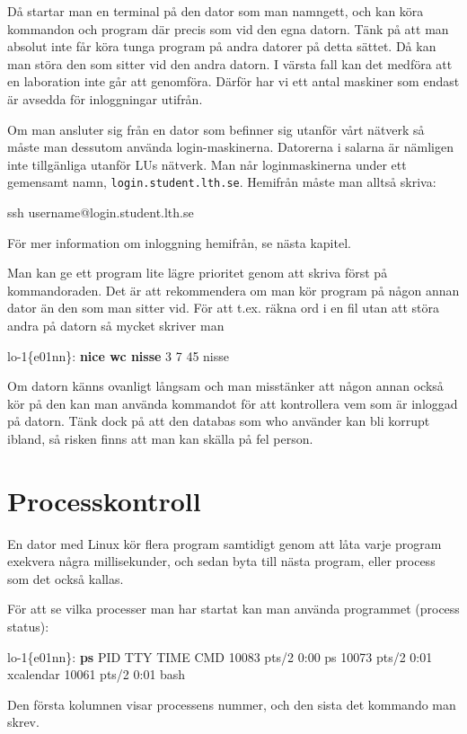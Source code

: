 \documentclass[a4paper,twocolumn]{book}
\begin{document}
Då startar man en terminal på den dator som man namngett, och kan köra
kommandon och program där precis som vid den egna datorn.
Tänk på att man absolut inte får köra tunga program på andra datorer
på detta sättet. Då kan man störa den som sitter vid den andra datorn.
I värsta fall kan det medföra att en laboration inte går att
genomföra. Därför har vi ett antal maskiner
som endast är avsedda för inloggningar utifrån.

Om man ansluter sig från en dator som befinner sig utanför vårt nätverk så
måste man dessutom använda login-maskinerna. Datorerna i salarna är nämligen
inte tillgänliga utanför LUs nätverk. Man når loginmaskinerna under ett gemensamt namn,
\texttt{login.student.lth.se}.
Hemifrån måste man alltså skriva:
\begin{ttquote}
  ssh username@login.student.lth.se
\end{ttquote}
För mer information om inloggning hemifrån, se nästa kapitel.

Man kan ge ett program lite lägre prioritet genom att skriva
 först på kommandoraden. Det är att rekommendera om man
kör program på någon annan dator än den som man sitter
vid. För att t.ex. räkna ord i en fil utan att störa andra på datorn så
mycket skriver man
\begin{example}
  lo-1\{e01nn\}: \textbf{nice wc nisse}
  3       7      45 nisse
\end{example}

Om datorn känns ovanligt långsam och man misstänker att någon annan
också kör på den kan man använda kommandot  för att
kontrollera vem som är inloggad på datorn. Tänk dock på att den
databas som who använder kan bli korrupt ibland, så risken finns att
man kan skälla på fel person.

\section{Processkontroll}

En dator med Linux kör flera program samtidigt genom
att låta varje program exekvera några millisekunder, och sedan byta
till nästa program, eller process som det också kallas.

För att se vilka processer man har startat kan man använda programmet
 (process status):
\begin{example}
  lo-1\{e01nn\}: \textbf{ps}
  PID TTY      TIME CMD
  10083 pts/2    0:00 ps
  10073 pts/2    0:01 xcalendar
  10061 pts/2    0:01 bash
\end{example}
Den första kolumnen visar processens nummer, och den sista det
kommando man skrev.
\end{document}
